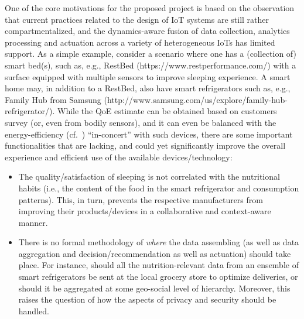 One of the core motivations for the proposed project is based on the observation that current practices related to the design of IoT systems are still rather compartmentalized, and the dynamics-aware fusion of data collection, analytics processing and actuation across a variety of heterogeneous IoTs has limited support. As a simple example, consider a scenario where one has a (collection of) smart bed(s), such as, e.g., RestBed (https://www.restperformance.com/) with a surface equipped with multiple sensors to improve sleeping experience. A smart home may, in addition to a RestBed, also have smart refrigerators such as, e.g., Family Hub from Samsung (http://www.samsung.com/us/explore/family-hub-refrigerator/). While the QoE estimate can be obtained based on customers survey (or, even from bodily sensors), and it can even be balanced with the energy-efficiency (cf.~\cite{FlorisMPA15}) ``in-concert'' with such devices, there are some important functionalities that are lacking, and could yet significantly improve the overall experience and efficient use of the available devices/technology:

\begin{itemize}
\item The quality/satisfaction of sleeping is not correlated with the nutritional habits (i.e., the content of the food in the smart refrigerator and consumption patterns). This, in turn, prevents the respective manufacturers from improving their products/devices in a collaborative and context-aware manner.
    
\item There is no formal methodology of {\it where} the data assembling (as well as data aggregation and decision/recommendation as well as actuation) should take place. For instance, should all the nutrition-relevant data from an ensemble of smart refrigerators be sent at the local grocery store to optimize deliveries, or should it be aggregated at some geo-social level of hierarchy. Moreover, this raises the question of how the aspects of privacy and security should be handled.
\end{itemize}






